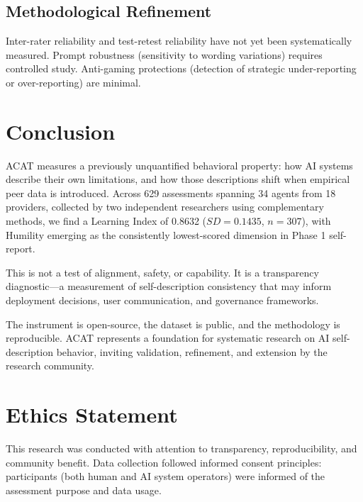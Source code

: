 \documentclass[11pt,a4paper]{article}
\begin{document}
\subsection{Methodological Refinement}

Inter-rater reliability and test-retest reliability have not yet been systematically measured. Prompt robustness (sensitivity to wording variations) requires controlled study. Anti-gaming protections (detection of strategic under-reporting or over-reporting) are minimal.

\section{Conclusion}

ACAT measures a previously unquantified behavioral property: how AI systems describe their own limitations, and how those descriptions shift when empirical peer data is introduced. Across 629 assessments spanning 34 agents from 18 providers, collected by two independent researchers using complementary methods, we find a Learning Index of 0.8632 ($SD = 0.1435$, $n = 307$), with Humility emerging as the consistently lowest-scored dimension in Phase 1 self-report.

This is not a test of alignment, safety, or capability. It is a transparency diagnostic---a measurement of self-description consistency that may inform deployment decisions, user communication, and governance frameworks.

The instrument is open-source, the dataset is public, and the methodology is reproducible. ACAT represents a foundation for systematic research on AI self-description behavior, inviting validation, refinement, and extension by the research community.

\section*{Ethics Statement}

This research was conducted with attention to transparency, reproducibility, and community benefit. Data collection followed informed consent principles: participants (both human and AI system operators) were informed of the assessment purpose and data usage.
\end{document}
